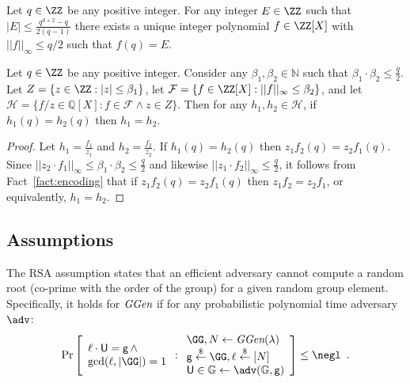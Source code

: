 \begin{fact}
\label{fact:encoding}
Let $q \in \ZZ$ be any positive integer. For any integer $E \in \ZZ$ such that $|E|\leq \frac{q^{d+2} - q}{2(q-1)}$ there exists a unique integer polynomial $f \in \ZZ[X]$ with $||f||_\infty \leq q/2$ such that $f(q) = E$. 
\end{fact} 

\begin{lemma}
\label{lem:encoding}
Let $q \in \ZZ$ be any positive integer. Consider any $\beta_1, \beta_2 \in \mathbb{N}$ such that $\beta_1 \cdot \beta_2 \leq \frac{q}{2}$. Let $Z = \{z \in \ZZ: |z| \leq \beta_1 \}$, let $\mathcal{F} = \{ f \in \ZZ[X]: ||f||_\infty \leq \beta_2\}$, and let $\mathcal{H} = \{f/z \in \mathbb{Q}[X]: f \in \mathcal{F} \wedge z \in Z \}$. Then for any $h_1, h_2 \in \mathcal{H}$,  if $h_1(q) = h_2(q)$ then $h_1 = h_2$. 
\end{lemma}
\begin{proof}
Let $h_1 = \frac{f_1}{z_1}$ and $h_2 = \frac{f_2}{z_2}$. If $h_1(q) = h_2(q)$ then $z_1 f_2(q) = z_2 f_1(q)$. Since $||z_2 \cdot f_1||_\infty \leq \beta_1 \cdot \beta_2 \leq \frac{q}{2}$ and  likewise $||z_1\cdot f_2||_\infty \leq \frac{q}{2}$, it follows from Fact~\ref{fact:encoding} that if $z_1 f_2(q) = z_2 f_1(q)$ then $z_1 f_2 = z_2 f_1$, or equivalently, $h_1 = h_2$.
\end{proof}

\subsection{Assumptions}

\begin{assumption}
	The RSA assumption states that an efficient adversary cannot compute a random root (co-prime with the order of the group) for a given random group element. Specifically, it holds for $\textit{GGen}$ if for any probabilistic polynomial time adversary $\adv$:
	\[
    \Pr\left[
    \begin{array}{l}
    \ell \cdot \gr{U} = \Generator \, \wedge \\
    \gcd(\ell,|\GG|)=1
    \end{array} :
    \begin{array}{l}
         \GG, N \leftarrow \ggen(\lambda)  \\
         \Generator \sample \GG, \ell \sample [N]  \\
         \gr{U} \in \mathbb{G} \leftarrow \adv(\mathbb{G}, \Generator) \\
    \end{array}\right] \leq \negl \enspace .
\]

\end{assumption}

